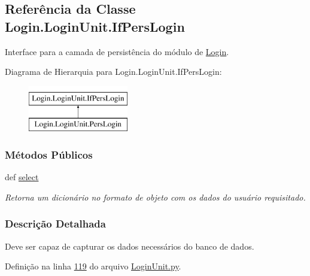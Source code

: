 \hypertarget{classLogin_1_1LoginUnit_1_1IfPersLogin}{\subsection{Referência da Classe Login.\-Login\-Unit.\-If\-Pers\-Login}
\label{classLogin_1_1LoginUnit_1_1IfPersLogin}
}


Interface para a camada de persistência do módulo de \hyperlink{namespaceLogin}{Login}.  


Diagrama de Hierarquia para Login.\-Login\-Unit.\-If\-Pers\-Login\-:\begin{figure}[H]
\begin{center}
\leavevmode
\includegraphics[height=2.000000cm]{da/dc3/classLogin_1_1LoginUnit_1_1IfPersLogin}
\end{center}
\end{figure}
\subsubsection*{Métodos Públicos}
\begin{DoxyCompactItemize}
\item 
def \hyperlink{classLogin_1_1LoginUnit_1_1IfPersLogin_a24648e1c42d0762277b5b7aa641fa575}{select}
\begin{DoxyCompactList}\small\item\em Retorna um dicionário no formato de objeto com os dados do usuário requisitado. \end{DoxyCompactList}\end{DoxyCompactItemize}


\subsubsection{Descrição Detalhada}
Deve ser capaz de capturar os dados necessários do banco de dados. 

Definição na linha \hyperlink{LoginUnit_8py_source_l00119}{119} do arquivo \hyperlink{LoginUnit_8py_source}{Login\-Unit.\-py}.



